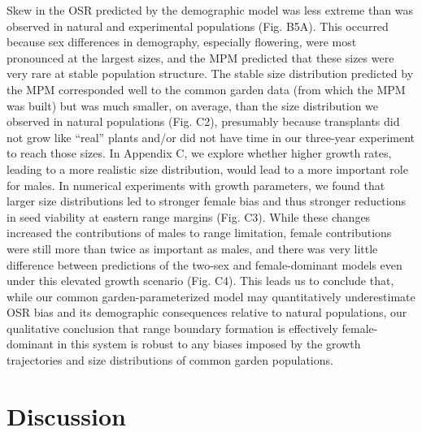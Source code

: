 \documentclass[11pt]{article}\usepackage[]{graphicx}\usepackage[]{color}
\begin{document}
Skew in the OSR predicted by the demographic model was less extreme than was observed in natural and experimental populations (Fig. B5A). 
This occurred because sex differences in demography, especially flowering, were most pronounced at the largest sizes, and the MPM predicted that these sizes were very rare at stable population structure. 
The stable size distribution predicted by the MPM corresponded well to the common garden data (from which the MPM was built) but was much smaller, on average, than the size distribution we observed in natural populations (Fig. C2), presumably because transplants did not grow like ``real'' plants and/or did not have time in our three-year experiment to reach those sizes. 
In Appendix C, we explore whether higher growth rates, leading to a more realistic size distribution, would lead to a more important role for males.
In numerical experiments with growth parameters, we found that larger size distributions led to stronger female bias and thus stronger reductions in seed viability at eastern range margins (Fig. C3). 
While these changes increased the contributions of males to range limitation, female contributions were still more than twice as important as males, and there was very little difference between predictions of the two-sex and female-dominant models even under this elevated growth scenario (Fig. C4). 
This leads us to conclude that, while our common garden-parameterized model may quantitatively underestimate OSR bias and its demographic consequences relative to natural populations, our qualitative conclusion that range boundary formation is effectively female-dominant in this system is robust to any biases imposed by the growth trajectories and size distributions of common garden populations. 



\section*{Discussion}
\end{document}
